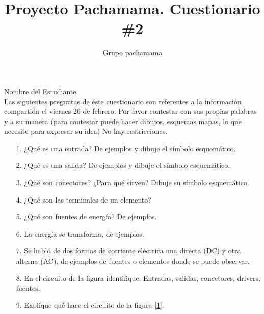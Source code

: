 \documentclass{article}
\title{Proyecto Pachamama. Cuestionario \#2}
\author{Grupo pachamama}
\begin{document}
\maketitle
Nombre del Estudiante:\\

Las siguientes preguntas de éste cuestionario son referentes a la información compartida el viernes 26 de febrero.
Por favor contestar con sus propias palabras y a su manera (para contestar puede hacer dibujos, esquemas mapas, lo que necesite para expresar su idea) No hay restricciones.

\begin{itemize}
		\item [1.] ¿Qué es una entrada? De ejemplos y dibuje el símbolo esquemático. 
		\item [2.] ¿Qué es una salida? De ejemplos y dibuje el símbolo esquemático.
		\item [3.] ¿Qué son conectores? ¿Para qué sirven? Dibuje su símbolo esquemático.
		\item [4.] ¿Qué son las terminales de un elemento?
		\item [5.] ¿Qué son fuentes de energía? De ejemplos.
		\item [6.] La energía se transforma, de ejemplos.
		\item [7.] Se habló de dos formas de corriente eléctrica una directa (DC) y otra alterna (AC), de ejemplos
				de fuentes o elementos donde se puede observar.
		\item [8.] En el circuito de la figura identifique: Entradas, salidas, conectores, drivers, fuentes.
		\item [9.] Explique qué hace el circuito de la figura \ref{1}.


\end{itemize}

%
\end{document}
